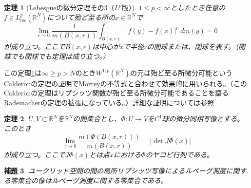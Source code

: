 \documentclass[leqno]{jsarticle}
\newtheorem{thm}{定理}
\newtheorem{lem}[thm]{補題}
\newcommand{\rr}{\mathbb{R}}
\newcommand{\mgn}{\infty}
\begin{document}
\begin{thm}[Lebesgueの微分定理その3（$L^p版$）]\label{p}$1\le p<\mgn$としたとき任意の
$f\in L_{loc}^p(\rr^N)$について殆ど至る所の$x\in \rr^N$で
\[
\lim_{r\to 0}\frac{1}{m(B(x,r))}\int_{B(x,r)}|f(y)-f(x)|^p\ dm(y)=0
\]
が成り立つ。ここで$B(x,r)$は中心が$x$で半径$r$の開球または、閉球を表す。（開球でも閉球でも定理は成り立つ。）
\end{thm}
この定理\ref{p}は$\mgn\ge p>N$のとき$W^{1,p}(\rr^N)$の元は殆ど至る所微分可能というCalder$\acute{\textrm{o}}$nの定理の証明でMorreyの不等式と合わせて効果的に用いられる。（このCalder$\acute{\textrm{o}}$nの定理はリプシッツ関数が殆ど至る所微分可能であることを語るRademacherの定理の拡張になっている。）詳細な証明については\cite{2}参照


\begin{thm}\label{det}
$U,V\subset \rr^N$を$\rr^N$の開集合とし、$\Phi:U\to V$を$C^1$球の微分同相写像とする。このとき
\[
\lim_{r\to 0}\frac{m(\Phi(B(x,r)))}{m(B(x,r))}=|\det J\Phi(x)|
\]
が成り立つ。ここで$J\Phi(x)$とは点$x$における$\Phi$のヤコビ行列である。
\end{thm}

\begin{lem}
ユークリッド空間の間の局所リプシッツ写像によるルベーグ測度に関する零集合の像はルベーグ測度に関する零集合である。
\end{lem}
\end{document}
